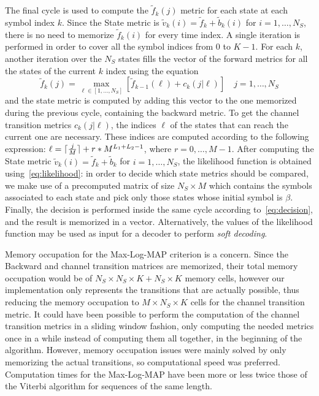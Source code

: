 \documentclass[10pt]{article}
\DeclarePairedDelimiter{\ceil}{\lceil}{\rceil}
\begin{document}
The final cycle is used to compute the $\tilde{f}_k(j)$ metric for each state at each symbol index $k$. Since the State metric is $\tilde{v}_k(i) = \tilde{f}_k + \tilde{b}_k(i)$ for $i = 1, \dots, N_S$, there is no need to memorize $\tilde{f}_k(i)$ for every time index. A single iteration is performed in order to cover all the symbol indices from $0$ to $K-1$. For each $k$, another iteration over the $N_S$ states fills the vector of the forward metrics for all the states of the current $k$ index using the equation
\begin{equation}
	\tilde{f}_k(j) = \max_{\ell \in [1, \dots, N_S]} [\tilde{f}_{k-1}(\ell) + c_k(j|\ell)] \quad j = 1, \dots, N_S
\end{equation}
and the state metric is computed by adding this vector to the one memorized during the previous cycle, containing the backward metric. To get the channel transition metrics $c_k(j|\ell)$, the indices $\ell$ of the states that can reach the current one are necessary. These indices are computed according to the following expression: $\ell = \ceil{\frac{j}{M}} + r*M^{L_1+L_2-1}$, where $r = 0, \dots, M-1$. 
After computing the State metric $\tilde{v}_k(i) = \tilde{f}_k + \tilde{b}_k$ for $i = 1, \dots, N_S$, the likelihood function is obtained using~\eqref{eq:likelihood}: in order to decide which state metrics should be compared, we make use of a precomputed matrix of size $N_S \times M$ which contains the symbols associated to each state and pick only those states whose initial symbol is $\beta$. Finally, the decision is performed inside the same cycle according to~\eqref{eq:decision}, and the result is memorized in a vector. Alternatively, the values of the likelihood function may be used as input for  a decoder to perform \emph{soft decoding}.

Memory occupation for the Max-Log-MAP criterion is a concern. Since the Backward and channel transition matrices are memorized, their total memory occupation would be of $N_S \times N_S \times K + N_S \times K$ memory cells, however our implementation only represents the transitions that are actually possible, thus reducing the memory occupation to $M \times N_S \times K$ cells for the channel transition metric. It could have been possible to perform the computation of the channel transition metrics in a sliding window fashion, only computing the needed metrics once in a while instead of computing them all together, in the beginning of the algorithm. However, memory occupation issues were mainly solved by only memorizing the actual transitions, so computational speed was preferred. 
Computation times for the Max-Log-MAP have been more or less twice those of the Viterbi algorithm for sequences of the same length.
\end{document}
